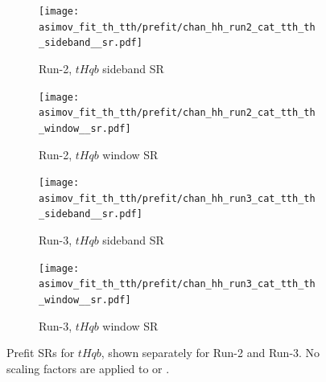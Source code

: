 \begin{figure}[htbp]
  \centering
  \begin{subfigure}[t]{0.45\textwidth}
    \centering
    \texttt{[image: asimov\_fit\_th\_tth/prefit/chan\_hh\_run2\_cat\_tth\_th\_sideband\_\_sr.pdf]}
    \caption{Run-2, $tHqb$ sideband SR}
  \end{subfigure}
  \hfill
  \begin{subfigure}[t]{0.45\textwidth}
    \centering
    \texttt{[image: asimov\_fit\_th\_tth/prefit/chan\_hh\_run2\_cat\_tth\_th\_window\_\_sr.pdf]}
    \caption{Run-2, $tHqb$ window SR}
  \end{subfigure}

  \vspace{0.4cm}
  \begin{subfigure}[t]{0.45\textwidth}
    \centering
    \texttt{[image: asimov\_fit\_th\_tth/prefit/chan\_hh\_run3\_cat\_tth\_th\_sideband\_\_sr.pdf]}
    \caption{Run-3, $tHqb$ sideband SR}
  \end{subfigure}
  \hfill
  \begin{subfigure}[t]{0.45\textwidth}
    \centering
    \texttt{[image: asimov\_fit\_th\_tth/prefit/chan\_hh\_run3\_cat\_tth\_th\_window\_\_sr.pdf]}
    \caption{Run-3, $tHqb$ window SR}
  \end{subfigure}

  \caption{Prefit SRs for $tHqb$, shown separately for Run-2 and Run-3. No scaling factors are applied to \ztautau or \ttbar.}
  \label{fig:srs_th}
\end{figure}

